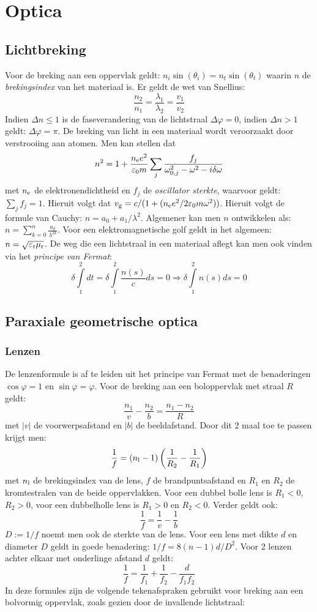 \chapter{Optica}
\section{Lichtbreking}
Voor de breking aan een oppervlak geldt: $n_i\sin(\theta_i)=n_t\sin(\theta_t)$
waarin $n$ de {\it brekingsindex} van het materiaal is. Er geldt de wet van
Snellius:
\[
\frac{n_2}{n_1}=\frac{\lambda_1}{\lambda_2}=\frac{v_1}{v_2}
\]
Indien $\Delta n\leq1$ is de faseverandering van de lichtstraal
$\Delta\varphi=0$, indien $\Delta n>1$ geldt: $\Delta\varphi=\pi$. De
breking van licht in een materiaal wordt veroorzaakt door verstrooiing
aan atomen. Men kan stellen dat
\[
n^2=1+\frac{n_{\rm e}e^2}{\varepsilon_0m}\sum_j\frac{f_j}{\omega_{0,j}^2-\omega^2-i\delta\omega}
\]
met $n_{\rm e}$ de elektronendichtheid en $f_j$ de {\it oscillator sterkte},
waarvoor geldt: $\sum\limits_j f_j=1$.
Hieruit volgt dat $v_{\rm g}=c/(1+(n_{\rm e}e^2/2\varepsilon_0m\omega^2))$.
Hieruit volgt de formule van Cauchy: $n=a_0+a_1/\lambda^2$. Algemener kan men
$n$ ontwikkelen als: $\displaystyle n=\sum_{k=0}^n\frac{a_k}{\lambda^{2k}}$.
\npar
Voor een elektromagnetische golf geldt in het algemeen:
$n=\sqrt{\varepsilon_{\rm r}\mu_{\rm r}}$.
\npar
De weg die een lichtstraal in een materiaal aflegt kan men ook vinden via
het {\it principe van Fermat}:
\[
\delta\int\limits_1^2 dt=\delta\int\limits_1^2\frac{n(s)}{c}ds=0\Rightarrow
\delta\int\limits_1^2 n(s)ds=0
\]

\section{Paraxiale geometrische optica}
\subsection{Lenzen}
De lenzenformule is af te leiden uit het principe van Fermat met de
benaderingen $\cos\varphi=1$ en $\sin\varphi=\varphi$. Voor de breking aan
een boloppervlak met straal $R$ geldt:
\[
\frac{n_1}{v}-\frac{n_2}{b}=\frac{n_1-n_2}{R}
\]
met $|v|$ de voorwerpsafstand en $|b|$ de beeldafstand. Door dit 2 maal toe
te passen krijgt men:
\[
\frac{1}{f}=(n_{\rm l}-1)\left(\frac{1}{R_2}-\frac{1}{R_1}\right)
\]
met $n_{\rm l}$ de brekingsindex van de lens, $f$ de brandpuntsafstand en
$R_1$ en $R_2$ de kromtestralen van de beide oppervlakken. Voor een dubbel
bolle lens is $R_1<0$, $R_2>0$, voor een dubbelholle lens is $R_1>0$ en
$R_2<0$. Verder geldt ook:
\[
\frac{1}{f}=\frac{1}{v}-\frac{1}{b}
\]
$D:=1/f$ noemt men ook de sterkte van de lens. Voor een lens met dikte $d$ en
diameter $D$ geldt in goede benadering: $1/f=8(n-1)d/D^2$. Voor 2 lenzen
achter elkaar met onderlinge afstand $d$ geldt:
\[
\frac{1}{f}=\frac{1}{f_1}+\frac{1}{f_2}-\frac{d}{f_1f_2}
\]
In deze formules zijn de volgende tekenafspraken gebruikt voor breking aan
een bolvormig oppervlak, zoals gezien door de invallende lichtstraal:

